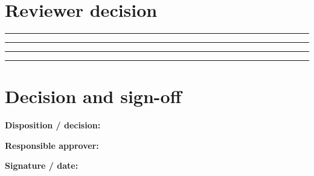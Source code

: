 \documentclass[10pt,letterpaper]{article}
\begin{document}
\section{Reviewer decision}
\noindent\rule{\linewidth}{0.4pt}\par\vspace{16pt}
\noindent\rule{\linewidth}{0.4pt}\par\vspace{16pt}
\noindent\rule{\linewidth}{0.4pt}\par\vspace{16pt}
\noindent\rule{\linewidth}{0.4pt}\par\vspace{16pt}
\section{Decision and sign-off}
\noindent\textbf{Disposition / decision:}\quad\hrulefill\par\vspace{11pt}
\noindent\textbf{Responsible approver:}\quad\hrulefill\par\vspace{11pt}
\noindent\textbf{Signature / date:}\quad\hrulefill\par\vspace{11pt}
\end{document}

